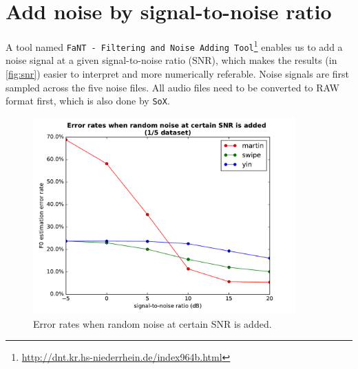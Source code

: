 \documentclass[11pt,a4paper]{report}
\begin{document}
\newpage

\section{Add noise by signal-to-noise ratio}

A tool named \texttt{FaNT - Filtering and Noise Adding Tool}\footnote{\url{http://dnt.kr.hs-niederrhein.de/index964b.html}} enables us to add a noise signal at a given signal-to-noise ratio (SNR), which makes the results (in \autoref{fig:snr}) easier to interpret and more numerically referable.
Noise signals are first sampled across the five noise files.
All audio files need to be converted to RAW format first, which is also done by \texttt{SoX}.

\begin{figure}[htbp]
  \centering
  \includegraphics[width=0.9\textwidth]{error_rates_vs_snrs.pdf}
  \caption{Error rates when random noise at certain SNR is added.} \label{fig:snr}
\end{figure}
\end{document}
